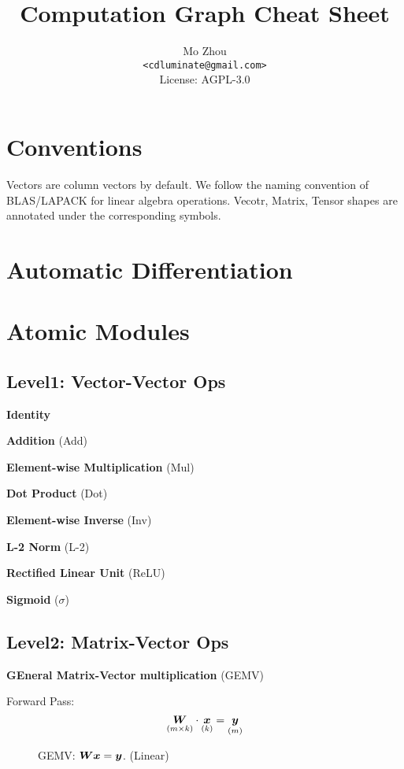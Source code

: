 \documentclass[9pt,twocolumn,times]{article}
\title{Computation Graph Cheat Sheet}
\author{Mo Zhou\\\small\texttt{<cdluminate@gmail.com>}\\
License: AGPL-3.0}
\begin{document}
\maketitle
\tableofcontents

\section{Conventions}

Vectors are column vectors by default.
We follow the naming convention of BLAS/LAPACK for linear algebra operations.
Vecotr, Matrix, Tensor shapes are annotated under the corresponding symbols.

\section{Automatic Differentiation}

\section{Atomic Modules}

\subsection{Level1: Vector-Vector Ops}

	\textbf{Identity}

	\textbf{Addition} (Add)

	\textbf{Element-wise Multiplication} (Mul)

	\textbf{Dot Product} (Dot)

	\textbf{Element-wise Inverse} (Inv)

	\textbf{L-2 Norm} (L-2)

	\textbf{Rectified Linear Unit} (ReLU)

	\textbf{Sigmoid} ($\sigma$)

\subsection{Level2: Matrix-Vector Ops}

	\textbf{GEneral Matrix-Vector multiplication} (GEMV)

	Forward Pass:
	\begin{equation}
		\underset{(m\times k)}{{\bm{W}}} \cdot \underset{(k)}{{\bm{x}}} =
		\underset{(m)}{{\bm{y}}}
	\end{equation}

	\begin{figure}[h]
		\centering
		\resizebox{0.618\columnwidth}{!}{%
			
		}
		\caption{GEMV: ${\bm{W}} {\bm{x}} = {\bm{y}}$. (Linear)}
	\end{figure}
\end{document}
